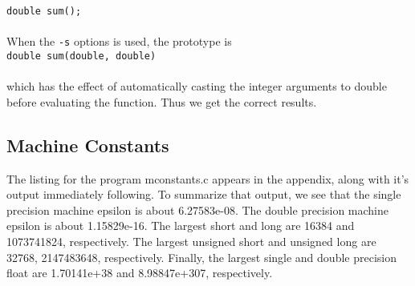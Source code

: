 \documentclass{article}
\begin{document}
{\tt double sum();}\\
\\
When the {\tt -s} options is used, the prototype is\\

{\tt double sum(double, double)}\\
\\
which has the effect of automatically casting the integer arguments 
to double before evaluating the function.  Thus we get the correct
results.

\subsection{Machine Constants}
\label{sec:mconstants}
The listing for the program mconstants.c appears in the appendix, along
with it's output immediately following.  To summarize that output, we
see that the single precision machine epsilon is about 6.27583e-08.
The double precision machine epsilon is about 1.15829e-16.  The
largest short and long are 16384 and 1073741824, respectively.
The largest unsigned short and unsigned long are 32768, 2147483648,
respectively.  Finally, the largest single and double precision float
are 1.70141e+38 and 8.98847e+307, respectively.
\end{document}
